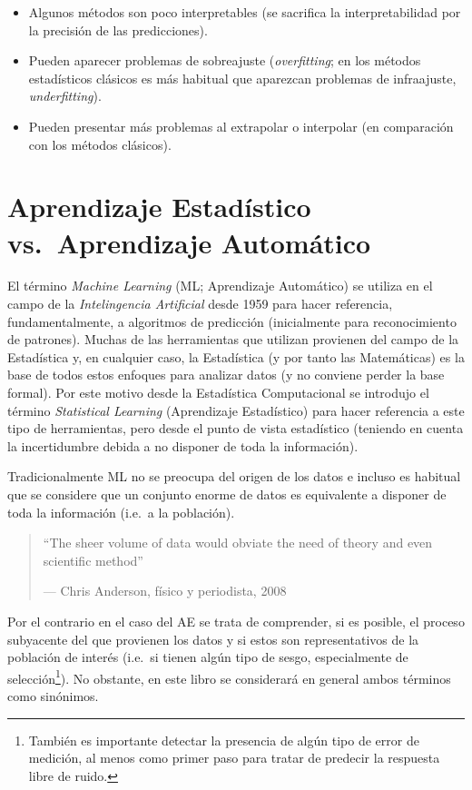 \documentclass[
]{book}
\theoremstyle{break}
\theoremstyle{nonumberplain}
\begin{document}
\begin{itemize}
\item
  Algunos métodos son poco interpretables (se sacrifica la interpretabilidad por la precisión de las predicciones).
\item
  Pueden aparecer problemas de sobreajuste (\emph{overfitting}; en los métodos estadísticos clásicos es más habitual que aparezcan problemas de infraajuste, \emph{underfitting}).
\item
  Pueden presentar más problemas al extrapolar o interpolar (en comparación con los métodos clásicos).
\end{itemize}

\hypertarget{aprendizaje-estaduxedstico-vs.-aprendizaje-automuxe1tico}{%
\section{Aprendizaje Estadístico vs.~Aprendizaje Automático}\label{aprendizaje-estaduxedstico-vs.-aprendizaje-automuxe1tico}}

El término \emph{Machine Learning} (ML; Aprendizaje Automático) se utiliza en el campo de la \emph{Intelingencia Artificial} desde 1959 para hacer referencia, fundamentalmente, a algoritmos de predicción (inicialmente para reconocimiento de patrones).
Muchas de las herramientas que utilizan provienen del campo de la Estadística y, en cualquier caso, la Estadística (y por tanto las Matemáticas) es la base de todos estos enfoques para analizar datos (y no conviene perder la base formal).
Por este motivo desde la Estadística Computacional se introdujo el término \emph{Statistical Learning} (Aprendizaje Estadístico) para hacer referencia a este tipo de herramientas, pero desde el punto de vista estadístico (teniendo en cuenta la incertidumbre debida a no disponer de toda la información).

Tradicionalmente ML no se preocupa del origen de los datos e incluso es habitual que se considere que un conjunto enorme de datos es equivalente a disponer de toda la información (i.e.~a la población).

\begin{quote}
``The sheer volume of data would obviate the need of theory and even scientific method''

--- Chris Anderson, físico y periodista, 2008
\end{quote}

Por el contrario en el caso del AE se trata de comprender, si es posible, el proceso subyacente del que provienen los datos y si estos son representativos de la población de interés (i.e.~si tienen algún tipo de sesgo, especialmente de selección\footnote{También es importante detectar la presencia de algún tipo de error de medición, al menos como primer paso para tratar de predecir la respuesta libre de ruido.}).
No obstante, en este libro se considerará en general ambos términos como sinónimos.
\end{document}
